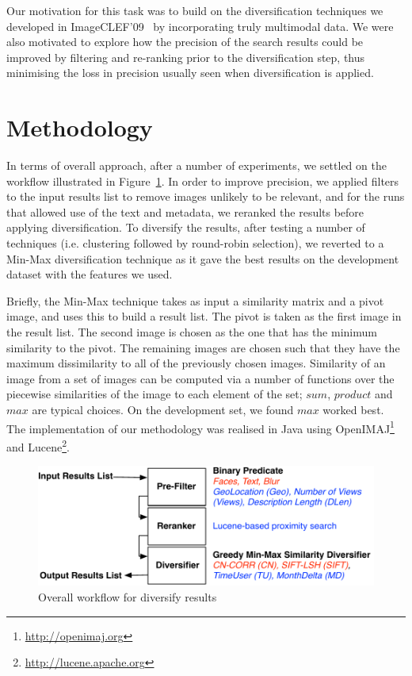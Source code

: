 \documentclass{../acm_proc_article-me11_tweaked}
\begin{document}
Our motivation for this task was to build on the diversification techniques we developed in ImageCLEF'09~\cite{ecs17993} by incorporating truly multimodal data. We were also motivated to explore how the precision of the search results could be improved by filtering and re-ranking prior to the diversification step, thus minimising the loss in precision usually seen when diversification is applied.

\section{Methodology}\label{sec:meth}
In terms of overall approach, after a number of experiments, we settled on the workflow illustrated in Figure~\ref{fig:overview}. In order to improve precision, we applied filters to the input results list to remove images unlikely to be relevant, and for the runs that allowed use of the text and metadata, we reranked the results before applying diversification. To diversify the results, after testing a number of techniques (i.e. clustering followed by round-robin selection), we reverted to a Min-Max diversification technique as it gave the best results on the development dataset with the features we used. 

Briefly, the Min-Max technique takes as input a similarity matrix and a pivot image, and uses this to build a result list. The pivot is taken as the first image in the result list. The second image is chosen as the one that has the minimum similarity to the pivot. The remaining images are chosen such that they have the maximum dissimilarity to all of the previously chosen images. Similarity of an image from a set of images can be computed via a number of functions over the piecewise similarities of the image to each element of the set; $sum$, $product$ and $max$ are typical choices. On the development set, we found $max$ worked best. The implementation of our methodology was realised in Java using OpenIMAJ\footnote{\url{http://openimaj.org}}~\cite{Hare:2011:OIJ:2072298.2072421} and Lucene\footnote{\url{http://lucene.apache.org}}. 

\begin{figure}
	\centering
	\includegraphics[width=0.9\columnwidth]{images/overview}
	\caption{\label{fig:overview}Overall workflow for diversify results}
\end{figure}
\end{document}
